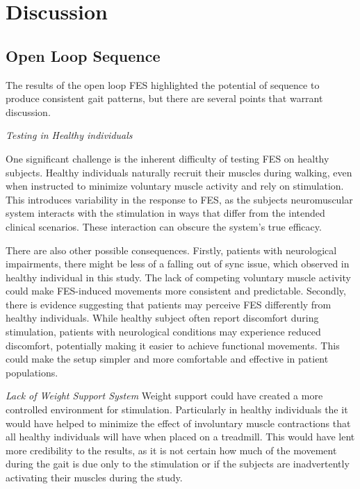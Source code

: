 

\section{Discussion}
\subsection{Open Loop Sequence}
The results of the open loop FES highlighted the potential of sequence to produce consistent gait patterns, but there are several points that warrant discussion.
\newline

\textit{Testing in Healthy individuals}

One significant challenge is the inherent difficulty of testing FES on healthy subjects. Healthy individuals naturally recruit their muscles during walking, even when instructed to minimize voluntary muscle activity and rely on stimulation. This introduces variability in the response to FES, as the subjects neuromuscular system interacts with the stimulation in ways that differ from the intended clinical scenarios. These interaction can obscure the system's true efficacy.

There are also other possible consequences. Firstly, patients with neurological impairments, there might be less of a falling out of sync issue, which observed in healthy individual in this study. The lack of competing voluntary muscle activity could make FES-induced movements more consistent and predictable. Secondly, there is evidence suggesting that patients may perceive FES differently from healthy individuals. While healthy subject often report discomfort during stimulation, patients with neurological conditions may experience reduced discomfort, potentially making it easier to achieve functional movements. This could make the setup simpler and more comfortable and effective in patient populations. 


\textit{Lack of Weight Support System}
Weight support could have created a more controlled environment for stimulation. Particularly in healthy individuals the it would have helped to minimize the effect of involuntary muscle contractions that all healthy individuals will have when placed on a treadmill. This would have lent more credibility to the results, as it is not certain how much of the movement during the gait is due only to the stimulation or if the subjects are inadvertently activating their muscles during the study.
\newline 


